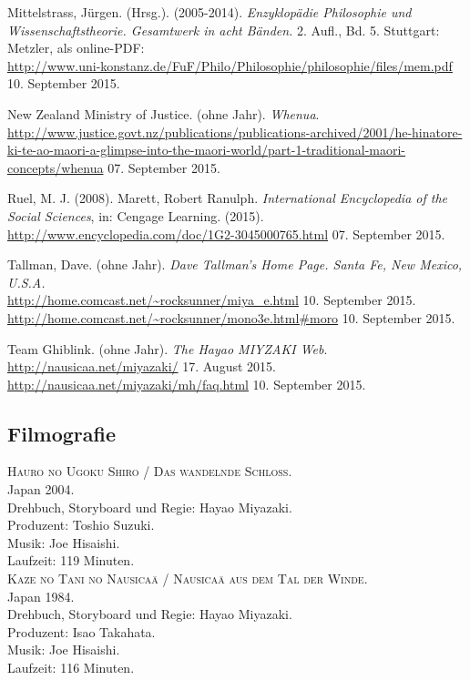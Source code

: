 \documentclass[a4paper]{article}
\begin{document}
\begin{thebibliography}{9}
	Mittelstrass, Jürgen. (Hrsg.). (2005-2014).
	\emph{Enzyklopädie Philosophie und Wissenschaftstheorie. Gesamtwerk in acht Bänden.} 2. Aufl., Bd. 5. Stuttgart: Metzler, als online-PDF:\\ \url{http://www.uni-konstanz.de/FuF/Philo/Philosophie/philosophie/files/mem.pdf} 10. September 2015.  

	New Zealand Ministry of Justice.
	(ohne Jahr).
	\emph{Whenua}.\\
	\url{http://www.justice.govt.nz/publications/publications-archived/2001/he-hinatore-ki-te-ao-maori-a-glimpse-into-the-maori-world/part-1-traditional-maori-concepts/whenua}	07. September 2015.

	Ruel, M. J. 
	(2008). 
	\glqq Marett, Robert Ranulph\grqq. \emph{International Encyclopedia of the Social Sciences}, in: Cengage Learning. (2015).\\ \url{http://www.encyclopedia.com/doc/1G2-3045000765.html} 07. September 2015.

	Tallman, Dave. (ohne Jahr). \emph{Dave Tallman's Home Page. Santa Fe, New Mexico, U.S.A.}\\ \url{http://home.comcast.net/~rocksunner/miya_e.html} 10. September 2015.\\ \url{http://home.comcast.net/~rocksunner/mono3e.html#moro} 10. September 2015.

	Team Ghiblink. (ohne Jahr). \emph{The Hayao MIYZAKI Web}.\\  
	\url{http://nausicaa.net/miyazaki/} 17. August 2015.\\
	\url{http://nausicaa.net/miyazaki/mh/faq.html} 10. September 2015.

\subsection*{Filmografie}

	\textsc{Hauro no Ugoku Shiro / Das wandelnde Schloss}.\\
	Japan 2004. \\
	Drehbuch, Storyboard und Regie: Hayao Miyazaki.\\
	Produzent: Toshio Suzuki. \\
	Musik: Joe Hisaishi. \\
	Laufzeit: 119 Minuten. \\

	\textsc{Kaze no Tani no Nausicaä / Nausicaä aus dem Tal der Winde}.\\ Japan 1984. \\
	Drehbuch, Storyboard und Regie: Hayao Miyazaki.\\
	Produzent: Isao Takahata. \\
	Musik: Joe Hisaishi. \\
	Laufzeit: 116 Minuten. \\


\end{thebibliography}
\end{document}
